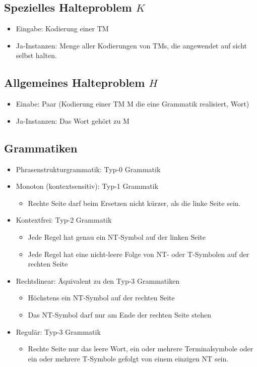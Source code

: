 \documentclass[ngerman]{scrartcl}
\begin{document}
\subsection{Spezielles Halteproblem $ K $}
\begin{itemize}
    \item Eingabe: Kodierung einer TM
    \item Ja-Instanzen: Menge aller Kodierungen von TMs, die angewendet auf sicht selbst halten.
\end{itemize}

\subsection{Allgemeines Halteproblem $ H $}
\begin{itemize}
    \item Einabe: Paar (Kodierung einer TM M die eine Grammatik realisiert, Wort)
    \item Ja-Instanzen: Das Wort gehört zu M
\end{itemize}

\subsection{Grammatiken}
\begin{itemize}
    \item Phrasenstrukturgrammatik: Typ-0 Grammatik
    \item Monoton (kontextsensitiv): Typ-1 Grammatik
    \begin{itemize}
        \item Rechte Seite darf beim Ersetzen nicht kürzer, als die linke Seite sein.
    \end{itemize}
    \item Kontextfrei: Typ-2 Grammatik
    \begin{itemize}
        \item Jede Regel hat genau ein NT-Symbol auf der linken Seite
        \item Jede Regel hat eine nicht-leere Folge von NT- oder T-Symbolen auf der rechten Seite
    \end{itemize}
    \item Rechtslinear: Äquivalent zu den Typ-3 Grammatiken 
    \begin{itemize}
        \item Höchstens ein NT-Symbol auf der rechten Seite
        \item Das NT-Symbol darf nur am Ende der rechten Seite stehen
    \end{itemize}
    \item Regulär: Typ-3 Grammatik
    \begin{itemize}
        \item Rechte Seite nur das leere Wort, ein oder mehrere Terminalsymbole oder ein oder mehrere T-Symbole gefolgt von einem einzigen NT sein.
    \end{itemize}
\end{itemize}
\end{document}
